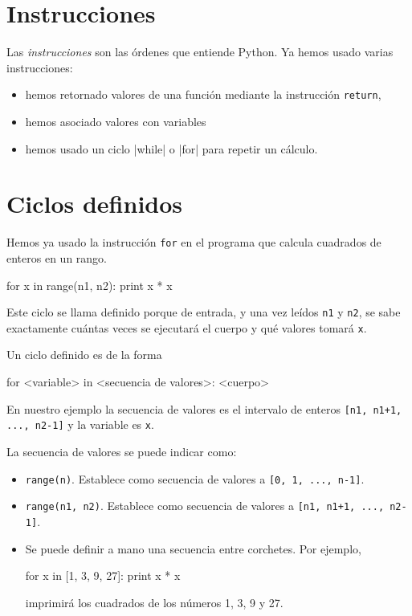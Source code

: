 \section{Instrucciones}

Las {\it instrucciones} son las órdenes que entiende Python. Ya
hemos usado varias instrucciones:

\begin{itemize}
\item hemos retornado valores de una función mediante la
instrucción \lstinline!return!,

\item hemos asociado valores con variables

\item hemos usado un ciclo |while| o |for| para repetir un cálculo.
\end{itemize}

\section{Ciclos definidos}
\label{ciclosdef}
Hemos ya usado la instrucción \lstinline!for! en el programa que calcula
cuadrados de enteros en un rango.

\begin{codigo-python-sn}
for x in range(n1, n2):
    print x * x
\end{codigo-python-sn}

Este ciclo se llama definido porque de entrada, y una vez leídos
\lstinline!n1! y \lstinline!n2!, se sabe exactamente cuántas veces se ejecutará
el cuerpo y qué valores tomará \lstinline!x!.

Un ciclo definido es de la forma

\begin{codigo-python-sn}
for <variable> in <secuencia de valores>:
    <cuerpo>
\end{codigo-python-sn}

En nuestro ejemplo la secuencia de valores es el intervalo de
enteros \lstinline![n1, n1+1, ..., n2-1]! y la variable es \lstinline!x!.

La secuencia de valores se puede indicar como:

\begin{itemize}
\item \lstinline!range(n)!. Establece como secuencia de valores a
 \lstinline![0, 1, ..., n-1]!.

\item \lstinline!range(n1, n2)!. Establece como secuencia de valores a
\lstinline![n1, n1+1, ..., n2-1]!.

\item Se puede definir a mano una secuencia entre corchetes. Por ejemplo,

\begin{codigo-python-sn}
for x in [1, 3, 9, 27]:
    print x * x
\end{codigo-python-sn}

imprimirá los cuadrados de los números 1, 3, 9 y 27.

\end{itemize}

